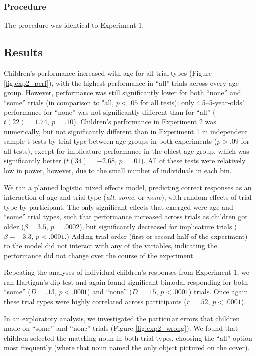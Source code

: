 \documentclass[man]{apa2}
\begin{document}
\subsubsection{Procedure}
The procedure was identical to Experiment 1.

\subsection{Results}

Children's performance increased with age for all trial types (Figure \ref{fig:exp2_perf}), with the highest performance in ``all'' trials across every age group. However, performance was still significantly lower for both ``none'' and ``some'' trials (in comparison to "all, $p < .05$ for all tests); only 4.5--5-year-olds' performance for ``none'' was not significantly different than for ``all'' ($t(22) = 1.74$, $p = .10$). Children's performance in Experiment 2 was numerically, but not significantly different than in Experiment 1 in independent sample t-tests by trial type between age groups in both experiments ($p > .09$ for all tests), except for implicature performance in the oldest age group, which was significantly better ($t(34) = -2.68$, $p = .01$). All of these tests were relatively low in power, however, due to the small number of individuals in each bin.

We ran a planned logistic mixed effects model, predicting correct responses as an interaction of age and trial type (\textit{all, some}, or \textit{none}), with random effects of trial type by participant. The only significant effects that emerged were age and ``some'' trial types, such that performance increased across trials as children got older ($\beta = 3.5$, $p =  .0002$), but significantly decreased for implicature trials ($\beta = -3.3$, $p < .0001$.) Adding trial order (first or second half of the experiment) to the model did not interact with any of the variables, indicating the performance did not change over the course of the experiment.

Repeating the analyses of individual children's responses from Experiment 1, we ran Hartigan's dip test and again found significant bimodal responding for both ``some'' ($D = .13$, $p < .0001$) and ``none'' ($D = .15$, $p < .0001$) trials. Once again these trial types were highly correlated across participants ($r = .52$, $p < .0001$).

In an exploratory analysis, we investigated the particular errors that children made on ``some'' and ``none'' trials (Figure \ref{fig:exp2_wrong}). We found that children selected the matching noun in both trial types, choosing the ``all'' option most frequently (where that noun named the only object pictured on the cover).
\end{document}
